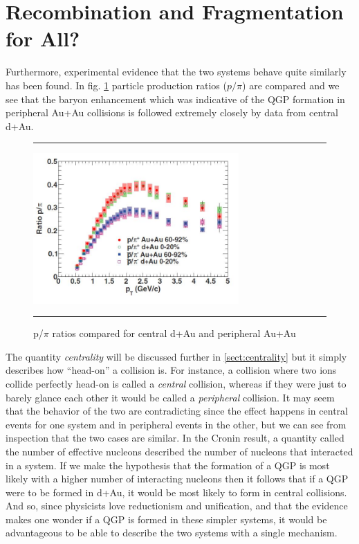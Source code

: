 \section{Recombination and Fragmentation for All?}
\label{sect:recombcold}
Furthermore, experimental evidence that the two systems behave quite similarly has been found. In fig. \ref{fig:daaaratios} particle production ratios ($p/\pi$) are compared and we see that the baryon enhancement which was indicative of the QGP formation in peripheral Au+Au collisions is followed extremely closely by data from central d+Au. 

\begin{figure}[htbp!]
  \centering    \rule{35em}{0.5pt}
    \includegraphics[width=0.7\textwidth]{prevplots/dAvsAAratios.JPG}

  \caption[p/$\pi$ ratios compared for central d+Au and peripheral Au+Au]{p/$\pi$ ratios compared for central d+Au and peripheral Au+Au\citep{PhysRevC.88.024906}}
  \label{fig:daaaratios}    \rule{35em}{0.5pt}
\end{figure} 

The quantity \textit{centrality} will be discussed further in \ref{sect:centrality} but it simply describes how ``head-on'' a collision is. For instance, a collision where two ions collide perfectly head-on is called a \textit{central} collision, whereas if they were just to barely glance each other it would be called a \textit{peripheral} collision. It may seem that the behavior of the two are contradicting since the effect happens in central events for one system and in peripheral events in the other, but we can see from inspection that the two cases are similar. In the Cronin result, a quantity called the number of effective nucleons described the number of nucleons that interacted in a system. If we make the hypothesis that the formation of a QGP is most likely with a higher number of interacting nucleons then it follows that if a QGP were to be formed in d+Au, it would be most likely to form in central collisions. And so, since physicists love reductionism and unification, and that the evidence makes one wonder if a QGP is formed in these simpler systems, it would be advantageous to be able to describe the two systems with a single mechanism.

